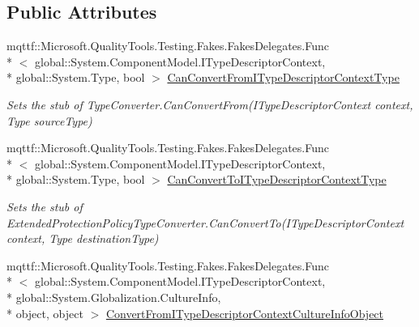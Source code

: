 \subsection*{Public Attributes}
\begin{DoxyCompactItemize}
\item 
mqttf\-::\-Microsoft.\-Quality\-Tools.\-Testing.\-Fakes.\-Fakes\-Delegates.\-Func\\*
$<$ global\-::\-System.\-Component\-Model.\-I\-Type\-Descriptor\-Context, \\*
global\-::\-System.\-Type, bool $>$ \hyperlink{class_system_1_1_security_1_1_authentication_1_1_extended_protection_1_1_fakes_1_1_stub_extendedf67afed15bbc0df07bfc91316f6f81f0_aee4d3ae3ee82b0fbf9a0aa54ce2748da}{Can\-Convert\-From\-I\-Type\-Descriptor\-Context\-Type}
\begin{DoxyCompactList}\small\item\em Sets the stub of Type\-Converter.\-Can\-Convert\-From(\-I\-Type\-Descriptor\-Context context, Type source\-Type)\end{DoxyCompactList}\item 
mqttf\-::\-Microsoft.\-Quality\-Tools.\-Testing.\-Fakes.\-Fakes\-Delegates.\-Func\\*
$<$ global\-::\-System.\-Component\-Model.\-I\-Type\-Descriptor\-Context, \\*
global\-::\-System.\-Type, bool $>$ \hyperlink{class_system_1_1_security_1_1_authentication_1_1_extended_protection_1_1_fakes_1_1_stub_extendedf67afed15bbc0df07bfc91316f6f81f0_acc95f33faea82ce618c5644397628fb4}{Can\-Convert\-To\-I\-Type\-Descriptor\-Context\-Type}
\begin{DoxyCompactList}\small\item\em Sets the stub of Extended\-Protection\-Policy\-Type\-Converter.\-Can\-Convert\-To(\-I\-Type\-Descriptor\-Context context, Type destination\-Type)\end{DoxyCompactList}\item 
mqttf\-::\-Microsoft.\-Quality\-Tools.\-Testing.\-Fakes.\-Fakes\-Delegates.\-Func\\*
$<$ global\-::\-System.\-Component\-Model.\-I\-Type\-Descriptor\-Context, \\*
global\-::\-System.\-Globalization.\-Culture\-Info, \\*
object, object $>$ \hyperlink{class_system_1_1_security_1_1_authentication_1_1_extended_protection_1_1_fakes_1_1_stub_extendedf67afed15bbc0df07bfc91316f6f81f0_ac051a01d2e59aca51a8e51984aa5fb41}{Convert\-From\-I\-Type\-Descriptor\-Context\-Culture\-Info\-Object}

\end{DoxyCompactItemize}
